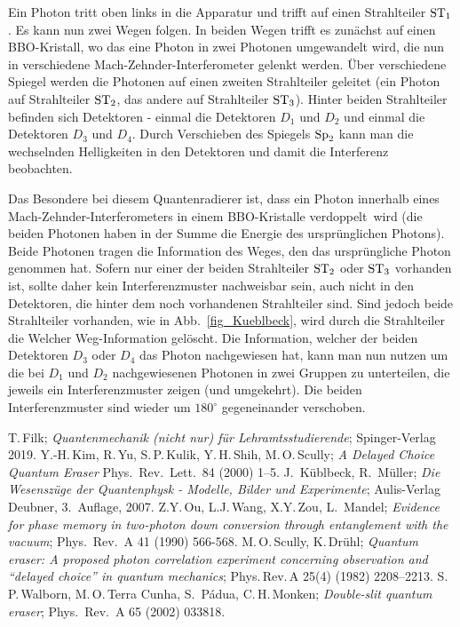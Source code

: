 Ein Photon tritt oben links in die Apparatur und trifft auf einen Strahlteiler ${\rm ST}_1$. Es kann nun
zwei Wegen folgen. In beiden Wegen trifft es zun\"achst auf einen BBO-Kristall, wo das eine Photon
in zwei Photonen umgewandelt wird, die nun in verschiedene Mach-Zehnder-Interferometer gelenkt
werden. \"Uber verschiedene Spiegel werden die Photonen auf einen zweiten Strahlteiler geleitet
(ein Photon auf Strahlteiler ${\rm ST}_2$, das andere auf Strahlteiler ${\rm ST}_3$). 
Hinter beiden Strahlteiler befinden sich Detektoren - einmal die Detektoren 
$D_1$ und $D_2$ und einmal die Detektoren $D_3$ und $D_4$. 
Durch Verschieben des Spiegels ${\rm Sp}_2$ kann man die wechselnden Helligkeiten
in den Detektoren und damit die Interferenz beobachten.

Das Besondere bei diesem Quantenradierer ist, dass ein Photon innerhalb eines Mach-Zehnder-Interferometers
in einem BBO-Kristalle \glqq verdoppelt\grqq\ wird (die beiden Photonen haben 
in der Summe die Energie des urspr\"unglichen Photons).
Beide Photonen tragen die Information des Weges, den das urspr\"ungliche Photon genommen
hat. Sofern nur einer der beiden Strahlteiler ${\rm ST}_2$ oder ${\rm ST}_3$ vorhanden ist, sollte
daher kein Interferenzmuster nachweisbar sein, auch nicht in den Detektoren, die hinter dem
noch vorhandenen Strahlteiler sind. Sind jedoch beide Strahlteiler vorhanden, wie in Abb.\ \ref{fig_Kueblbeck},
wird durch die Strahlteiler die \glqq Welcher Weg\grqq-Information gel\"oscht.
Die Information, welcher der beiden Detektoren $D_3$ oder $D_4$ das Photon nachgewiesen
hat, kann man nun nutzen um die bei $D_1$ und $D_2$ nachgewiesenen Photonen in zwei Gruppen
zu unterteilen, die jeweils ein Interferenzmuster zeigen (und umgekehrt). 
Die beiden Interferenzmuster sind wieder um $180^\circ$ gegeneinander verschoben.   


\begin{thebibliography}{99}
 T.\,Filk; \textit{Quantenmechanik (nicht nur) f\"ur Lehramtsstudierende};
          Spinger-Verlag 2019. 
 Y.-H.\,Kim, R.\,Yu, S.\,P.\,Kulik, Y.\,H.\,Shih, M.\,O.\,Scully; \textit{A Delayed Choice Quantum Eraser}
            Phys.\ Rev.\ Lett.\ 84 (2000) 1--5.          
 J.\ K\"ublbeck, R.\ M\"uller; \textit{Die Wesensz\"uge der Quantenphysk - Modelle,
           Bilder und Experimente}; Aulis-Verlag Deubner, 3.\ Auflage, 2007.   
 Z.Y.\,Ou, L.J.\,Wang, X.Y.\,Zou, L.\ Mandel; \textit{Evidence for phase memory in two-photon
           down conversion through entanglement with the vacuum}; Phys.\ Rev.\ A 41 (1990) 566-568.                     
 M.\,O.\,Scully, K.\,Dr\"uhl; \textit{Quantum eraser: A proposed photon correlation
         experiment concerning observation and ``delayed choice'' in quantum mechanics}; 
         Phys.\,Rev.\,A 25(4) (1982) 2208--2213.          
 S.\,P.\,Walborn, M.\,O.\,Terra Cunha, S.\ P\'{a}dua, C.\,H.\,Monken;
         \textit{Double-slit quantum eraser}; Phys.\ Rev.\ A 65 (2002) 033818.
\end{thebibliography}
%

